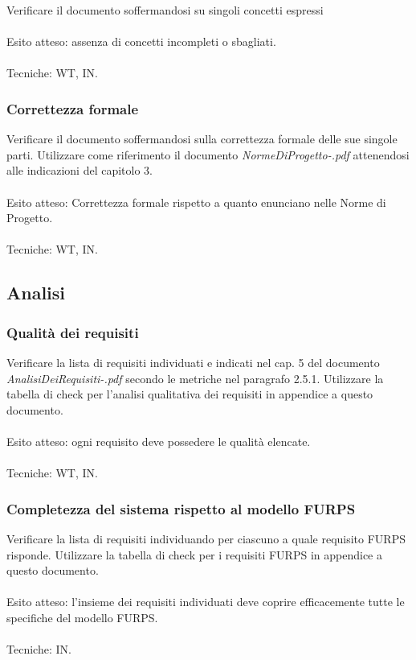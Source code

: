 Verificare il documento soffermandosi su singoli concetti espressi
\\\\
Esito atteso: assenza di concetti incompleti o sbagliati.
\\\\
Tecniche: WT, IN.

\subsubsection*{Correttezza formale}

Verificare il documento soffermandosi sulla correttezza formale delle sue 
singole parti. Utilizzare come riferimento il documento
\emph{NormeDiProgetto-\versionenormeprogetto.pdf} attenendosi alle indicazioni del capitolo 3.
\\\\
Esito atteso: Correttezza formale rispetto a quanto enunciano nelle Norme di
Progetto.
\\\\
Tecniche: WT, IN.


\subsection{Analisi}

\subsubsection*{Qualit\`a dei requisiti}

Verificare la lista di requisiti individuati e indicati nel cap. 5 del documento
\emph{AnalisiDeiRequisiti-\versioneAR.pdf} secondo le metriche nel paragrafo 2.5.1.
Utilizzare la tabella di check per l'analisi qualitativa dei requisiti in
appendice a questo documento.
\\\\
Esito atteso: ogni requisito deve possedere le qualit\`a elencate.
\\\\
Tecniche: WT, IN.


\subsubsection*{Completezza del sistema rispetto al modello FURPS}

Verificare la lista di requisiti individuando per ciascuno a quale requisito
FURPS risponde. Utilizzare la tabella di check per i requisiti FURPS in
appendice a questo documento.
\\\\
Esito atteso: l'insieme dei requisiti individuati deve coprire
efficacemente tutte le specifiche del modello FURPS.
\\\\ Tecniche: IN.

